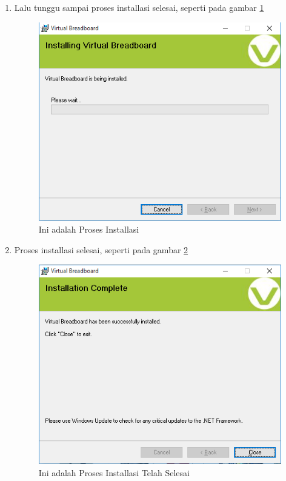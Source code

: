 \begin{enumerate}
\item Lalu tunggu sampai proses installasi selesai, seperti pada gambar \ref{fig:prosesinstallasi}
\begin{figure}[!htbp]
  \centering
  \includegraphics[width=.75\textwidth]{figures/VBB/prosesinstallasi.png}
  \caption{Ini adalah Proses Installasi}\label{fig:prosesinstallasi}
\end{figure}

\item Proses installasi selesai, seperti pada gambar \ref{fig:installasiselesai}
\begin{figure}[!htbp]
  \centering
  \includegraphics[width=.75\textwidth]{figures/VBB/installasiselesai.png}
  \caption{Ini adalah Proses Installasi Telah Selesai}\label{fig:installasiselesai}
\end{figure}
\end{enumerate} 